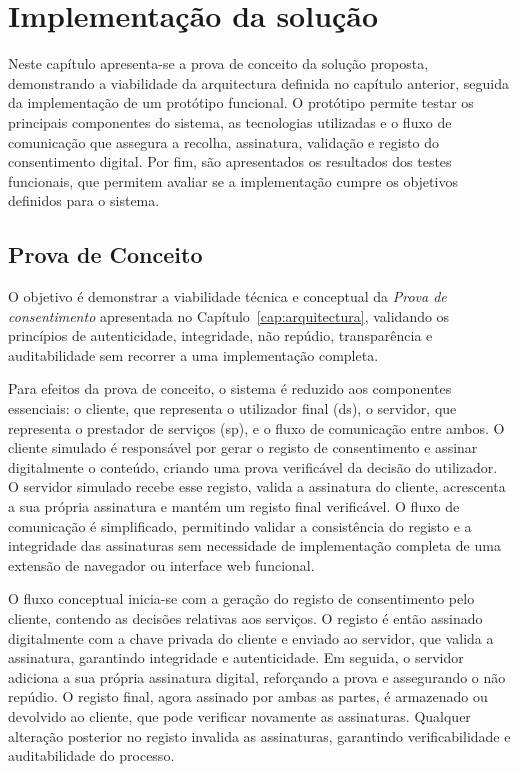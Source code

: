 \label{cap:implementacao}
\chapter{Implementação da solução}

Neste capítulo apresenta-se a prova de conceito da solução proposta, demonstrando a viabilidade da arquitectura definida no capítulo anterior, seguida da implementação de um protótipo funcional. O protótipo permite testar os principais componentes do sistema, as tecnologias utilizadas e o fluxo de comunicação que assegura a recolha, assinatura, validação e registo do consentimento digital. Por fim, são apresentados os resultados dos testes funcionais, que permitem avaliar se a implementação cumpre os objetivos definidos para o sistema.

\section{Prova de Conceito}

O objetivo é demonstrar a viabilidade técnica e conceptual da \textit{Prova de consentimento} apresentada no Capítulo~\ref{cap:arquitectura}, validando os princípios de autenticidade, integridade, não repúdio, transparência e auditabilidade sem recorrer a uma implementação completa.

Para efeitos da prova de conceito, o sistema é reduzido aos componentes essenciais: o cliente, que representa o utilizador final (\acrshort{ds}), o servidor, que representa o prestador de serviços (\acrshort{sp}), e o fluxo de comunicação entre ambos. O cliente simulado é responsável por gerar o registo de consentimento e assinar digitalmente o conteúdo, criando uma prova verificável da decisão do utilizador. O servidor simulado recebe esse registo, valida a assinatura do cliente, acrescenta a sua própria assinatura e mantém um registo final verificável. O fluxo de comunicação é simplificado, permitindo validar a consistência do registo e a integridade das assinaturas sem necessidade de implementação completa de uma extensão de navegador ou interface web funcional.

O fluxo conceptual inicia-se com a geração do registo de consentimento pelo cliente, contendo as decisões relativas aos serviços. O registo é então assinado digitalmente com a chave privada do cliente e enviado ao servidor, que valida a assinatura, garantindo integridade e autenticidade. Em seguida, o servidor adiciona a sua própria assinatura digital, reforçando a prova e assegurando o não repúdio. O registo final, agora assinado por ambas as partes, é armazenado ou devolvido ao cliente, que pode verificar novamente as assinaturas. Qualquer alteração posterior no registo invalida as assinaturas, garantindo verificabilidade e auditabilidade do processo.

